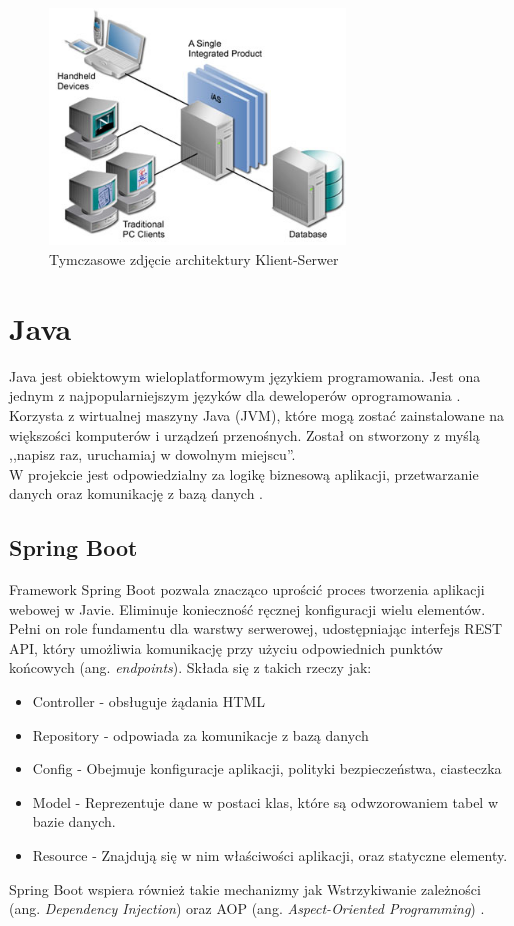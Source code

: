 \begin{figure}[H]
	\centering
	\includegraphics[width=0.7\textwidth]{images/vis.jpg}
	\caption{Tymczasowe zdjęcie architektury Klient-Serwer}
	\label{fig:KlientSerwer}
\end{figure}
\section{Java}
Java jest obiektowym wieloplatformowym językiem programowania. Jest ona jednym z najpopularniejszym języków dla deweloperów oprogramowania \cite{JavaMicrosoft}. Korzysta z wirtualnej maszyny Java (JVM), które mogą zostać zainstalowane na większości komputerów i urządzeń przenośnych. Został on stworzony z myślą ,,napisz raz, uruchamiaj w dowolnym miejscu''. 
\\W projekcie jest odpowiedzialny za logikę biznesową aplikacji, przetwarzanie danych oraz komunikację z bazą danych \cite{JDK21Docs}.
\subsection*{Spring Boot}
Framework Spring Boot pozwala znacząco uprościć proces tworzenia aplikacji webowej w Javie. Eliminuje konieczność ręcznej konfiguracji wielu elementów. Pełni on role fundamentu dla warstwy serwerowej, udostępniając interfejs REST API, który umożliwia komunikację przy użyciu odpowiednich punktów końcowych (ang. \textit{endpoints}). Składa się z takich rzeczy jak:
\begin{itemize}
	\item Controller - obsługuje żądania HTML
	\item Repository - odpowiada za komunikacje z bazą danych
	\item Config - Obejmuje konfiguracje aplikacji, polityki bezpieczeństwa, ciasteczka
	\item Model - Reprezentuje dane w postaci klas, które są odwzorowaniem tabel w bazie danych.
	\item Resource - Znajdują się w nim właściwości aplikacji, oraz statyczne elementy.
\end{itemize}
Spring Boot wspiera również takie mechanizmy jak Wstrzykiwanie zależności (ang. \textit{Dependency Injection}) oraz AOP (ang. \textit{Aspect-Oriented Programming}) \cite{SpringDocs}.
